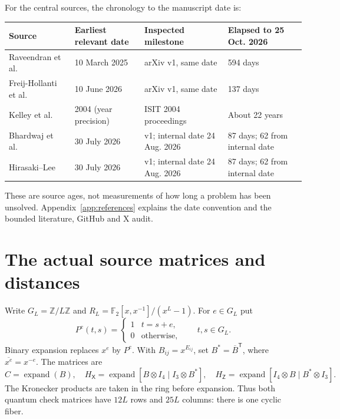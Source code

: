 \documentclass[11pt]{article}
\theoremstyle{definition}\newtheorem{definition}[theorem]{Definition}
\newcommand{\F}{\mathbb F_2}
\newcommand{\Z}{\mathbb Z}
\newcommand{\HX}{H_{\mathsf X}}
\newcommand{\HZ}{H_{\mathsf Z}}
\begin{document}
For the central sources, the chronology to the manuscript date is:
\begin{center}\small
\begin{tabular}{@{}P{.25\textwidth}P{.22\textwidth}P{.23\textwidth}P{.22\textwidth}@{}}
\toprule Source&Earliest relevant date&Inspected milestone&Elapsed to 25 Oct. 2026\\\midrule
Raveendran et al.~\cite{RDV}&10 March 2025&arXiv v1, same date&594 days\\
Freij-Hollanti et al.~\cite{FHM}&10 June 2026&arXiv v1, same date&137 days\\
Kelley et al.~\cite{Kelley}&2004 (year precision)&ISIT 2004 proceedings&About 22 years\\
Bhardwaj et al.~\cite{Bhardwaj}&30 July 2026&v1; internal date 24 Aug. 2026&87 days; 62 from internal date\\
Hirasaki--Lee~\cite{Hirasaki}&30 July 2026&v1; internal date 24 Aug. 2026&87 days; 62 from internal date\\
\bottomrule
\end{tabular}
\end{center}
These are source ages, not measurements of how long a problem has been
unsolved. Appendix~\ref{app:references} explains the date convention and
the bounded literature, GitHub and X audit.

\section{The actual source matrices and distances}\label{sec:model}
Write $G_L=\Z/L\Z$ and
$R_L=\F[x,x^{-1}]/(x^L-1)$. For $e\in G_L$ put
\[
 P^e(t,s)=\begin{cases}1&t=s+e,\\0&\text{otherwise},\end{cases}
 \qquad t,s\in G_L.
\]
Binary expansion replaces $x^e$ by $P^e$. With
$B_{ij}=x^{E_{ij}}$, set $B^*=\overline B^{\mathsf T}$, where
$\overline{x^e}=x^{-e}$. The matrices are
\begin{equation}\label{eq:source}
 C=\operatorname{expand}(B),\quad
 \HX=\operatorname{expand}[B\otimes I_4\mid I_3\otimes B^*],\quad
 \HZ=\operatorname{expand}[I_4\otimes B\mid B^*\otimes I_3].
\end{equation}
The Kronecker products are taken in the ring before expansion. Thus both
quantum check matrices have $12L$ rows and $25L$ columns: there is one
cyclic fiber.
\end{document}
